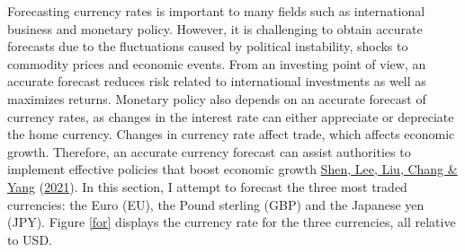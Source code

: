 \documentclass[11pt,preprint, authoryear]{elsarticle}
\numberwithin{equation}{section}
\numberwithin{figure}{section}
\numberwithin{table}{section}
\begin{document}
Forecasting currency rates is important to many fields such as
international business and monetary policy. However, it is challenging
to obtain accurate forecasts due to the fluctuations caused by political
instability, shocks to commodity prices and economic events. From an
investing point of view, an accurate forecast reduces risk related to
international investments as well as maximizes returns. Monetary policy
also depends on an accurate forecast of currency rates, as changes in
the interest rate can either appreciate or depreciate the home currency.
Changes in currency rate affect trade, which affects economic growth.
Therefore, an accurate currency forecast can assist authorities to
implement effective policies that boost economic growth
\protect\hyperlink{ref-shen}{Shen, Lee, Liu, Chang \& Yang}
(\protect\hyperlink{ref-shen}{2021}). In this section, I attempt to
forecast the three most traded currencies: the Euro (EU), the Pound
sterling (GBP) and the Japanese yen (JPY). Figure \ref{for} displays the
currency rate for the three currencies, all relative to USD.
\end{document}
